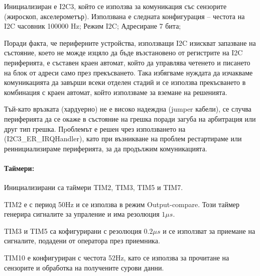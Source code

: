Инициализиран е I2C3,
който се използва за комуникация със сензорите (жироскоп, акселерометър).
Използвана е следната конфигурация --
честота на I2C часовник 100000 Hz;
Режим I2C;
Адресиране 7 бита;

Поради факта, че периферните устройства, използващи I2C 
изискват запазване на състояние, което не можде изцяло да 
бъде възстановено от регистрите на I2C периферията,
е съставен краен автомат, който да управлява четенето и 
писането на блок от адреси само през прекъсването.
Така избягваме нуждата да изчакваме комуникацията да завърши
всеки отделен стадий и се използва прекъсването в комбинация
с краен автомат, който използваме за вземане на решенията.

Тъй-като връзката (хардуерно) не е високо надеждна
(jumper кабели), се случва периферията да се окаже в
състояние на грешка поради загуба на арбитрация или
друг тип грешка.
Пpоблемът е решен чрез използването на (I2C3\_ER\_IRQHandler),
като при възникване на проблем рестартираме или реинициализираме
периферията, за да продължим комуникацията.

\paragraph{Таймери:}

Инициализирани са таймери TIM2, TIM3, TIM5 и TIM7. 

TIM2 е с период 50Hz и се използва в режим Output-compare.
Този таймер генерира сигналите за упраление и има резолюция \(1\mu s\).

TIM3 и TIM5 са кофигурирани с резолюция \(0.2\mu s\) и се използват за приемане на сигналите, подадени от оператора през приемника.

TIM10 е конфигуриран с честота 52Hz, като се използва за прочитане на сензорите и обработка на получените сурови данни.


